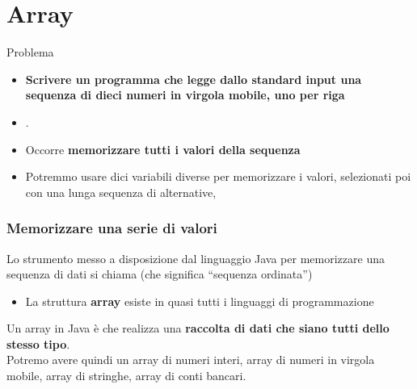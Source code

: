 \section*{Array}
\begin{frame}
\begin{block}{}
\begin{huge}
\begin{center}
\end{center}
\end{huge}
\end{block}
\end{frame}


\begin{frame}
\begin{block}{Problema}
\begin{itemize}
\item \textbf{\alert{Scrivere un programma che legge dallo standard input una sequenza di dieci numeri in virgola mobile, uno per riga}}
\item {}.
\end{itemize}
\end{block}
\begin{block}{}
\begin{itemize}
\item Occorre \textbf{memorizzare tutti i valori della sequenza}
\pause
\item Potremmo usare dici variabili diverse per memorizzare i valori, selezionati poi con una lunga sequenza di alternative,
\textbf{}
\end{itemize}
\end{block}
\end{frame}

\begin{frame}
\frametitle{Memorizzare una serie di valori}
\begin{block}{}
Lo strumento messo a disposizione dal linguaggio Java per memorizzare una sequenza di dati si chiama \textbf{}
(che significa ``sequenza ordinata'')
\begin{itemize}
\item La struttura \textbf{array} esiste in quasi tutti i linguaggi di programmazione
\end{itemize}
\end{block}
\begin{block}{}
Un array in Java è \textbf{} che realizza una \textbf{\alert{raccolta di dati che siano tutti dello stesso tipo}}.\\
Potremo avere quindi un array di numeri interi, array di numeri in virgola mobile, array di stringhe, array di conti bancari.
\end{block}
\end{frame}

